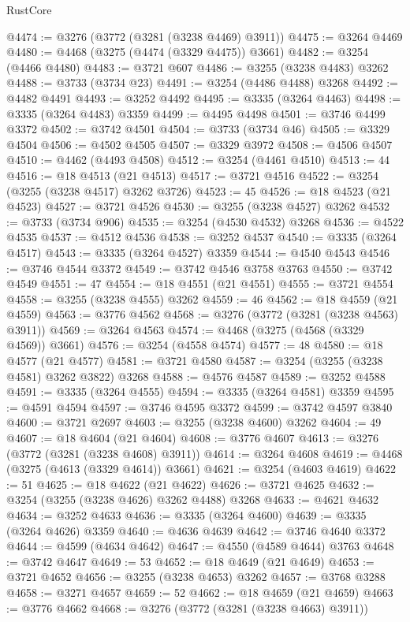 \begin{lexlean}{RustCore}
\begin{coremodule}
@4474 := @3276 (@3772 (@3281 (@3238 @4469) @3911))
@4475 := @3264 @4469
@4480 := @4468 (@3275 (@4474 (@3329 @4475)) @3661)
@4482 := @3254 (@4466 @4480)
@4483 := @3721 @607
@4486 := @3255 (@3238 @4483) @3262
@4488 := @3733 (@3734 @23)
@4491 := @3254 (@4486 @4488) @3268
@4492 := @4482 @4491
@4493 := @3252 @4492
@4495 := @3335 (@3264 @4463)
@4498 := @3335 (@3264 @4483) @3359
@4499 := @4495 @4498
@4501 := @3746 @4499 @3372
@4502 := @3742 @4501
@4504 := @3733 (@3734 @46)
@4505 := @3329 @4504
@4506 := @4502 @4505
@4507 := @3329 @3972
@4508 := @4506 @4507
@4510 := @4462 (@4493 @4508)
@4512 := @3254 (@4461 @4510)
@4513 := 44
@4516 := @18 @4513 (@21 @4513)
@4517 := @3721 @4516
@4522 := @3254 (@3255 (@3238 @4517) @3262 @3726)
@4523 := 45
@4526 := @18 @4523 (@21 @4523)
@4527 := @3721 @4526
@4530 := @3255 (@3238 @4527) @3262
@4532 := @3733 (@3734 @906)
@4535 := @3254 (@4530 @4532) @3268
@4536 := @4522 @4535
@4537 := @4512 @4536
@4538 := @3252 @4537
@4540 := @3335 (@3264 @4517)
@4543 := @3335 (@3264 @4527) @3359
@4544 := @4540 @4543
@4546 := @3746 @4544 @3372
@4549 := @3742 @4546 @3758 @3763
@4550 := @3742 @4549
@4551 := 47
@4554 := @18 @4551 (@21 @4551)
@4555 := @3721 @4554
@4558 := @3255 (@3238 @4555) @3262
@4559 := 46
@4562 := @18 @4559 (@21 @4559)
@4563 := @3776 @4562
@4568 := @3276 (@3772 (@3281 (@3238 @4563) @3911))
@4569 := @3264 @4563
@4574 := @4468 (@3275 (@4568 (@3329 @4569)) @3661)
@4576 := @3254 (@4558 @4574)
@4577 := 48
@4580 := @18 @4577 (@21 @4577)
@4581 := @3721 @4580
@4587 := @3254 (@3255 (@3238 @4581) @3262 @3822) @3268
@4588 := @4576 @4587
@4589 := @3252 @4588
@4591 := @3335 (@3264 @4555)
@4594 := @3335 (@3264 @4581) @3359
@4595 := @4591 @4594
@4597 := @3746 @4595 @3372
@4599 := @3742 @4597 @3840
@4600 := @3721 @2697
@4603 := @3255 (@3238 @4600) @3262
@4604 := 49
@4607 := @18 @4604 (@21 @4604)
@4608 := @3776 @4607
@4613 := @3276 (@3772 (@3281 (@3238 @4608) @3911))
@4614 := @3264 @4608
@4619 := @4468 (@3275 (@4613 (@3329 @4614)) @3661)
@4621 := @3254 (@4603 @4619)
@4622 := 51
@4625 := @18 @4622 (@21 @4622)
@4626 := @3721 @4625
@4632 := @3254 (@3255 (@3238 @4626) @3262 @4488) @3268
@4633 := @4621 @4632
@4634 := @3252 @4633
@4636 := @3335 (@3264 @4600)
@4639 := @3335 (@3264 @4626) @3359
@4640 := @4636 @4639
@4642 := @3746 @4640 @3372
@4644 := @4599 (@4634 @4642)
@4647 := @4550 (@4589 @4644) @3763
@4648 := @3742 @4647
@4649 := 53
@4652 := @18 @4649 (@21 @4649)
@4653 := @3721 @4652
@4656 := @3255 (@3238 @4653) @3262
@4657 := @3768 @3288
@4658 := @3271 @4657
@4659 := 52
@4662 := @18 @4659 (@21 @4659)
@4663 := @3776 @4662
@4668 := @3276 (@3772 (@3281 (@3238 @4663) @3911))

\end{coremodule}
\end{lexlean}

